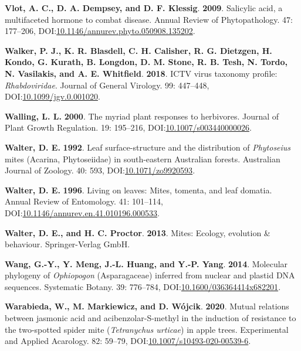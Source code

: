 \documentclass[12pt,final,CPage]{ufthesis}
\newlength{\cslhangindent}
\newenvironment{CSLReferences}[2] %
{%
	\setlength{\parindent}{0pt}
	\ifodd #1 \everypar{\setlength{\hangindent}{\cslhangindent}}\ignorespaces\fi
	\ifnum #2 > 0
	\setlength{\parskip}{#2\baselineskip}
	\fi
}%
{}
\begin{document}
{\begin{CSLReferences}{1}{0}
  \leavevmode{}%
  \textbf{Vlot, A. C., D. A. Dempsey, and D. F. Klessig}. \textbf{2009}. Salicylic acid, a multifaceted hormone to combat disease. Annual Review of Phytopathology. 47: 177--206, DOI:\href{https://doi.org/10.1146/annurev.phyto.050908.135202}{10.1146/annurev.phyto.050908.135202}.

  \leavevmode{}%
  \textbf{Walker, P. J., K. R. Blasdell, C. H. Calisher, R. G. Dietzgen, H. Kondo, G. Kurath, B. Longdon, D. M. Stone, R. B. Tesh, N. Tordo, N. Vasilakis, and A. E. Whitfield}. \textbf{2018}. {ICTV} virus taxonomy profile: {\emph{Rhabdoviridae}}. Journal of General Virology. 99: 447--448, DOI:\href{https://doi.org/10.1099/jgv.0.001020}{10.1099/jgv.0.001020}.

  \leavevmode{}%
  \textbf{Walling, L. L.} \textbf{2000}. The myriad plant responses to herbivores. Journal of Plant Growth Regulation. 19: 195--216, DOI:\href{https://doi.org/10.1007/s003440000026}{10.1007/s003440000026}.

  \leavevmode{}%
  \textbf{Walter, D. E.} \textbf{1992}. Leaf surface-structure and the distribution of {\emph{Phytoseius}} mites ({Acarina}, {Phytoseiidae}) in south-eastern {Australian} forests. Australian Journal of Zoology. 40: 593, DOI:\href{https://doi.org/10.1071/zo9920593}{10.1071/zo9920593}.

  \leavevmode{}%
  \textbf{Walter, D. E.} \textbf{1996}. Living on leaves: Mites, tomenta, and leaf domatia. Annual Review of Entomology. 41: 101--114, DOI:\href{https://doi.org/10.1146/annurev.en.41.010196.000533}{10.1146/annurev.en.41.010196.000533}.

  \leavevmode{}%
  \textbf{Walter, D. E., and H. C. Proctor}. \textbf{2013}. Mites: Ecology, evolution \& behaviour. Springer-Verlag GmbH.

  \leavevmode{}%
  \textbf{Wang, G.-Y., Y. Meng, J.-L. Huang, and Y.-P. Yang}. \textbf{2014}. Molecular phylogeny of {\emph{Ophiopogon}} {({Asparagaceae})} inferred from nuclear and plastid {DNA} sequences. Systematic Botany. 39: 776--784, DOI:\href{https://doi.org/10.1600/036364414x682201}{10.1600/036364414x682201}.

  \leavevmode{}%
  \textbf{Warabieda, W., M. Markiewicz, and D. Wójcik}. \textbf{2020}. Mutual relations between jasmonic acid and acibenzolar-{S}-methyl in the induction of resistance to the two-spotted spider mite ({\emph{Tetranychus urticae}}) in apple trees. Experimental and Applied Acarology. 82: 59--79, DOI:\href{https://doi.org/10.1007/s10493-020-00539-6}{10.1007/s10493-020-00539-6}.


\end{CSLReferences}}
\end{document}
